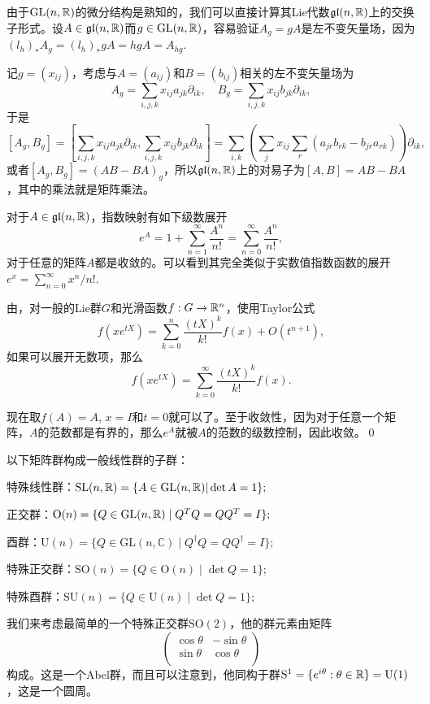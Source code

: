 \documentclass[10pt]{article}
\newcommand{\cc}{\mathbb{C}}
\begin{document}

由于$\mathrm{GL}(n,\mathbb{R})$的微分结构是熟知的，我们可以直接计算其Lie代数$\mathfrak{gl}(n,\mathbb{R})$上的交换子形式。设$A\in\mathfrak{gl}(n,\mathbb{R})$而$g\in\mathrm{GL}(n,\mathbb{R})$，容易验证$A_g=gA$是左不变矢量场，因为$(l_h)_{*}A_g=(l_h)_{*}gA=hgA=A_{hg}$.

记$g=(x_{ij})$，考虑与$A=(a_{ij})$和$B=(b_{ij})$相关的左不变矢量场为
\[
A_g=\sum_{i,j,k}x_{ij}a_{jk}\partial_{ik},\quad B_g=\sum_{i,j,k}x_{ij}b_{jk}\partial_{ik},
\]
于是
\[
[A_g,B_g]=\left[\sum_{i,j,k}x_{ij}a_{jk}\partial_{ik},\sum_{i,j,k}x_{ij}b_{jk}\partial_{ik}\right]=\sum_{i,k}\left(\sum_{j}x_{ij}\sum_{r}(a_{jr}b_{rk}-b_{jr}a_{rk})\right)\partial_{ik},
\]
或者$[A_g,B_g]=(AB-BA)_g$，所以$\mathfrak{gl}(n,\mathbb{R})$上的对易子为$[A,B]=AB-BA$，其中的乘法就是矩阵乘法。

\para 对于$A\in\mathfrak{gl}(n,\mathbb{R})$，指数映射有如下级数展开
\[
	e^A=1+\sum_{n=1}^\infty \frac{A^n}{n!}=\sum_{n=0}^\infty \frac{A^n}{n!},
\]
对于任意的矩阵$A$都是收敛的。可以看到其完全类似于实数值指数函数的展开$e^x=\sum_{n=0}^\infty x^n/n!$.

\proof 由，对一般的Lie群$G$和光滑函数$f:G\to \mathbb{R}^n$，使用Taylor公式
\[
	f(xe^{tX})=\sum_{k=0}^n\frac{(tX)^{k}}{k!}f(x)+O(t^{n+1}),
\]
如果可以展开无数项，那么
\[
	f(xe^{tX})=\sum_{k=0}^\infty\frac{(tX)^{k}}{k!}f(x).
\]

现在取$f(A)=A$, $x=I$和$t=0$就可以了。至于收敛性，因为对于任意一个矩阵，$A$的范数都是有界的，那么$e^A$就被$A$的范数的级数控制，因此收敛。\qed

\para 以下矩阵群构成一般线性群的子群：

 特殊线性群：$\mathrm{SL}(n,\mathbb{R})=\{A\in \mathrm{GL}(n,\mathbb{R})|\det A=1\};$

 正交群：$\mathrm{O}(n) = \{ Q \in \mathrm{GL}(n,\mathbb{R}) \mid Q^T Q = Q Q^T = I \};$

 酉群：$\mathrm{U}(n) = \{ Q \in \mathrm{GL}(n,\cc) \mid Q^\dag Q = Q Q^\dag = I \};$

 特殊正交群：$\mathrm{SO}(n) =\{ Q \in \mathrm{O}(n) \mid \det Q=1 \};$

 特殊酉群：$\mathrm{SU}(n) =\{ Q \in \mathrm{U}(n) \mid \det Q=1 \};$

我们来考虑最简单的一个特殊正交群$\mathrm{SO}(2)$，他的群元素由矩阵
\[
	\begin{pmatrix}
	\cos \theta&-\sin \theta\\
	\sin \theta&\cos \theta\\
	\end{pmatrix}
\]
构成。这是一个Abel群，而且可以注意到，他同构于群$\mathrm{S}^1=\{e^{i\theta}:\theta\in\mathbb{R}\}=\mathrm{U}(1)$，这是一个圆周。
\end{document}

